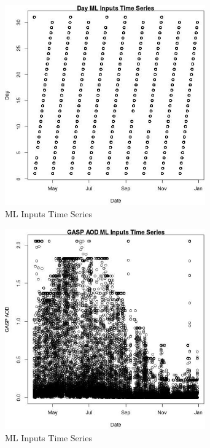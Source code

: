 \begin{figure} 
\centering  
\includegraphics[width=0.77\textwidth]{Code_Outputs/Report_ML_input_PM25_Step4_part_e_de_duplicated_aves_DayvDate.jpg} 
\caption{\label{fig:Report_ML_input_PM25_Step4_part_e_de_duplicated_avesDayvDate}ML Inputs Time Series} 
\end{figure} 
 

\clearpage 

\begin{figure} 
\centering  
\includegraphics[width=0.77\textwidth]{Code_Outputs/Report_ML_input_PM25_Step4_part_e_de_duplicated_aves_GASP_AODvDate.jpg} 
\caption{\label{fig:Report_ML_input_PM25_Step4_part_e_de_duplicated_avesGASP_AODvDate}ML Inputs Time Series} 
\end{figure} 
 

